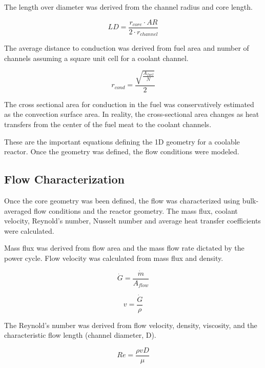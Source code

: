 The length over diameter was derived from the channel radius and core length.

\begin{equation}
    LD = \frac{r_{core}\cdot AR}{2\cdot r_{channel}}
\end{equation}

The average distance to conduction was derived from fuel area and number of
channels assuming a square unit cell for a coolant channel.

\begin{equation}
    r_{cond} = \frac{\sqrt{\frac{A_{fuel}}{N}}}{2}
    \label{r_cond}
\end{equation}

The cross sectional area for conduction in the fuel was conservatively estimated
as the convection surface area. In reality, the cross-sectional area changes as
heat transfers from the center of the fuel meat to the coolant channels.

These are the important equations defining the 1D geometry for a coolable
reactor. Once the geometry was defined, the flow conditions were modeled.

\subsection{Flow Characterization}

Once the core geometry was been defined, the flow was characterized using
bulk-averaged flow conditions and the reactor geometry. The mass flux, coolant
velocity, Reynold's number, Nusselt number and average heat transfer
coefficients were calculated.

Mass flux was derived from flow area and the mass flow rate dictated by the power
cycle. Flow velocity was calculated from mass flux and density.

\begin{equation}
    \dot{G} = \frac{\dot{m}}{A_{flow}}
\end{equation}

\begin{equation}
    v = \frac{\dot{G}}{\rho}
\end{equation}

The Reynold's number was derived from flow velocity, density, viscosity, and the
characteristic flow length (channel diameter, D).

\begin{equation}
    Re = \frac{\rho v D}{\mu}
\end{equation}

